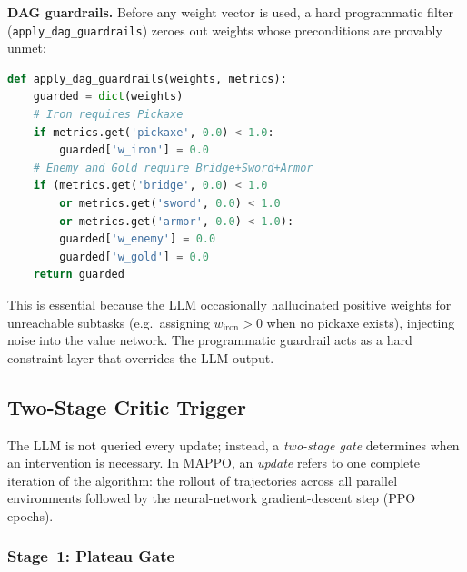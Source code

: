 \noindent
\textbf{DAG guardrails.}
Before any weight vector is used, a hard programmatic filter
(\texttt{apply\_dag\_guardrails}) zeroes out weights whose
preconditions are provably unmet:
\begin{lstlisting}[style=code, language=Python, caption={DAG guardrail enforcement in \texttt{orchestrator.py}.}, label={lst:dag_guardrail}]
def apply_dag_guardrails(weights, metrics):
    guarded = dict(weights)
    # Iron requires Pickaxe
    if metrics.get('pickaxe', 0.0) < 1.0:
        guarded['w_iron'] = 0.0
    # Enemy and Gold require Bridge+Sword+Armor
    if (metrics.get('bridge', 0.0) < 1.0
        or metrics.get('sword', 0.0) < 1.0
        or metrics.get('armor', 0.0) < 1.0):
        guarded['w_enemy'] = 0.0
        guarded['w_gold'] = 0.0
    return guarded
\end{lstlisting}

This is essential because the LLM occasionally hallucinated positive
weights for unreachable subtasks (e.g.\ assigning $w_{\text{iron}}>0$
when no pickaxe exists), injecting noise into the value network.
The programmatic guardrail acts as a hard constraint layer that
overrides the LLM output.

\subsection{Two-Stage Critic Trigger}
\label{sec:critic_trigger}

The LLM is not queried every update; instead, a \emph{two-stage gate}
determines when an intervention is necessary.
In MAPPO, an \emph{update} refers to one complete iteration of the
algorithm: the rollout of trajectories across all parallel environments
followed by the neural-network gradient-descent step (PPO epochs).

\subsubsection{Stage~1: Plateau Gate}

